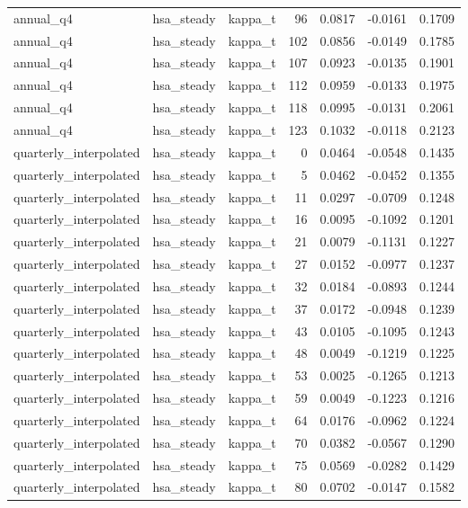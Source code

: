 \begin{tabular}{lllrrrr}
annual\_q4 & hsa\_steady & kappa\_t & 96 & 0.0817 & -0.0161 & 0.1709 \\
annual\_q4 & hsa\_steady & kappa\_t & 102 & 0.0856 & -0.0149 & 0.1785 \\
annual\_q4 & hsa\_steady & kappa\_t & 107 & 0.0923 & -0.0135 & 0.1901 \\
annual\_q4 & hsa\_steady & kappa\_t & 112 & 0.0959 & -0.0133 & 0.1975 \\
annual\_q4 & hsa\_steady & kappa\_t & 118 & 0.0995 & -0.0131 & 0.2061 \\
annual\_q4 & hsa\_steady & kappa\_t & 123 & 0.1032 & -0.0118 & 0.2123 \\
quarterly\_interpolated & hsa\_steady & kappa\_t & 0 & 0.0464 & -0.0548 & 0.1435 \\
quarterly\_interpolated & hsa\_steady & kappa\_t & 5 & 0.0462 & -0.0452 & 0.1355 \\
quarterly\_interpolated & hsa\_steady & kappa\_t & 11 & 0.0297 & -0.0709 & 0.1248 \\
quarterly\_interpolated & hsa\_steady & kappa\_t & 16 & 0.0095 & -0.1092 & 0.1201 \\
quarterly\_interpolated & hsa\_steady & kappa\_t & 21 & 0.0079 & -0.1131 & 0.1227 \\
quarterly\_interpolated & hsa\_steady & kappa\_t & 27 & 0.0152 & -0.0977 & 0.1237 \\
quarterly\_interpolated & hsa\_steady & kappa\_t & 32 & 0.0184 & -0.0893 & 0.1244 \\
quarterly\_interpolated & hsa\_steady & kappa\_t & 37 & 0.0172 & -0.0948 & 0.1239 \\
quarterly\_interpolated & hsa\_steady & kappa\_t & 43 & 0.0105 & -0.1095 & 0.1243 \\
quarterly\_interpolated & hsa\_steady & kappa\_t & 48 & 0.0049 & -0.1219 & 0.1225 \\
quarterly\_interpolated & hsa\_steady & kappa\_t & 53 & 0.0025 & -0.1265 & 0.1213 \\
quarterly\_interpolated & hsa\_steady & kappa\_t & 59 & 0.0049 & -0.1223 & 0.1216 \\
quarterly\_interpolated & hsa\_steady & kappa\_t & 64 & 0.0176 & -0.0962 & 0.1224 \\
quarterly\_interpolated & hsa\_steady & kappa\_t & 70 & 0.0382 & -0.0567 & 0.1290 \\
quarterly\_interpolated & hsa\_steady & kappa\_t & 75 & 0.0569 & -0.0282 & 0.1429 \\
quarterly\_interpolated & hsa\_steady & kappa\_t & 80 & 0.0702 & -0.0147 & 0.1582 \\

\end{tabular}
